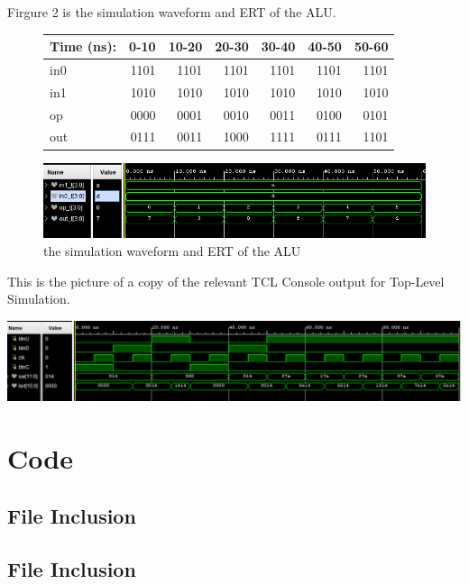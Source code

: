 \documentclass[11pt]{article}
\newcommand{\Verilog}[2][]{%
	
}
\begin{document}
Firgure 2 is the simulation waveform and ERT of the ALU.\\
\begin{figure}[ht]\centering
	\begin{tabular}{l|rrrrrr}
		Time (ns): & 0-10 & 10-20 & 20-30 & 30-40 & 40-50 & 50-60 \\
		\midrule
		in0 & 1101 & 1101 & 1101 & 1101 & 1101 & 1101 \\
		in1 & 1010 & 1010 & 1010 & 1010 & 1010 & 1010 \\
		op	& 0000 & 0001 & 0010 & 0011 & 0100 & 0101 \\
		\midrule
		out & 0111 & 0011 & 1000 & 1111 & 0111 & 1101 \\
		\bottomrule
	\end{tabular}\medskip
	
	\includegraphics[width=1\textwidth]{alu_simulation}
	\caption{the simulation waveform and ERT of the ALU}
	\label{fig:alu_simulation}
\end{figure}


This is the picture of a copy of the relevant TCL Console output for Top-Level Simulation.
\begin{center}
	\includegraphics[width=1\textwidth]{top_level_simulation}
\end{center}


\section*{Code}


\subsection*{File Inclusion}
\Verilog[caption=mux4 Verilog code,label=code:file_ex]{register.sv}

\subsection*{File Inclusion}
\Verilog[caption=mux4 Test Benches Verilog code,label=code:file_ex]{register_test.sv}
\end{document}
